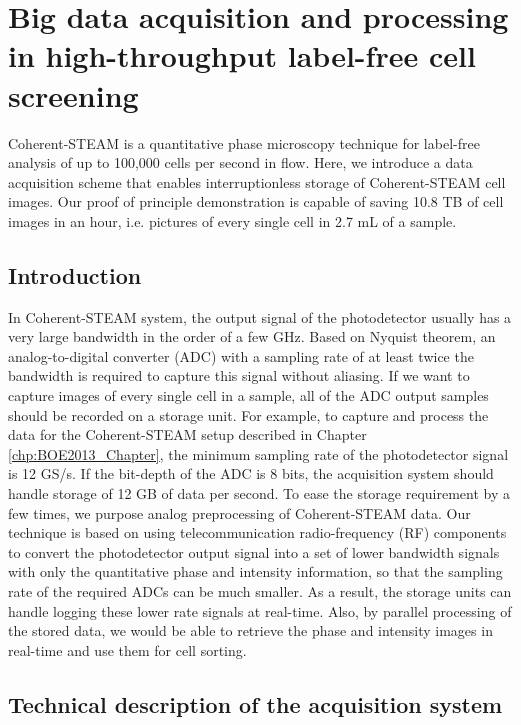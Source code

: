 \chapter{Big data acquisition and processing in high-throughput label-free cell screening}
\label{chp:CLEO2015_Chapter}

Coherent-STEAM is a quantitative phase microscopy technique for label-free analysis of up to 100,000 cells per second in flow. Here, we introduce a data acquisition scheme that enables interruptionless storage of Coherent-STEAM cell images. Our proof of principle demonstration is capable of saving 10.8 TB of cell images in an hour, i.e. pictures of every single cell in 2.7 mL of a sample.

\section{Introduction}

In Coherent-STEAM system, the output signal of the photodetector usually has a very large bandwidth in the order of a few GHz. Based on Nyquist theorem, an analog-to-digital converter (ADC) with a sampling rate of at least twice the bandwidth is required to capture this signal without aliasing. If we want to capture images of every single cell in a sample, all of the ADC output samples should be recorded on a storage unit. For example, to capture and process the data for the Coherent-STEAM setup described in Chapter \ref{chp:BOE2013_Chapter}, the minimum sampling rate of the photodetector signal is 12 GS/s. If the bit-depth of the ADC is 8 bits, the acquisition system should handle storage of 12 GB of data per second. To ease the storage requirement by a few times, we purpose analog preprocessing of Coherent-STEAM data. Our technique is based on using telecommunication radio-frequency (RF) components to convert the photodetector output signal into a set of lower bandwidth signals with only the quantitative phase and intensity information, so that the sampling rate of the required ADCs can be much smaller. As a result, the storage units can handle logging these lower rate signals at real-time. Also, by parallel processing of the stored data, we would be able to retrieve the phase and intensity images in real-time and use them for cell sorting.

\section{Technical description of the acquisition system}


